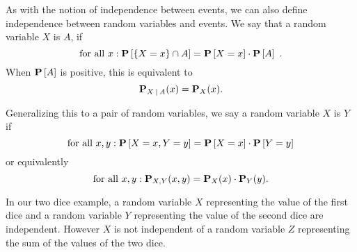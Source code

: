 As with the notion of independence between events, we can also define
independence between random variables and events.
%
We say that a random variable $X$ is 
$A$, if 
\[
\mbox{for all}~x: \mathbf{P}\left[{\{X =x\} \cap A}\right] = \mathbf{P}\left[{X = x}\right] \cdot \mathbf{P}\left[{A}\right]~.
\] 
%
When $\mathbf{P}\left[{A}\right]$ is positive, this is equivalent to 
\[
\mathbf{P}_{X {\:\mid\:} A} (x) = \mathbf{P}_{X}(x).
\]

Generalizing this to a pair of random variables, we say a random variable
$X$ is  $Y$ if 
\[
\mbox{for all}~x, y: \mathbf{P}\left[{X = x, Y = y}\right] = \mathbf{P}\left[{X = x}\right] \cdot \mathbf{P}\left[{Y = y}\right]
\]
%
or equivalently
\[
\mbox{for all}~x, y: \mathbf{P}_{X,Y}(x,y) = \mathbf{P}_{X}(x) \cdot \mathbf{P}_{Y}(y).
\]

In our two dice
example, a random variable $X$ representing the value of the first
dice and a random variable $Y$ representing the value of the second
dice are independent. 
%
However $X$ is not independent of a random variable $Z$ representing
the sum of the values of the two dice.



